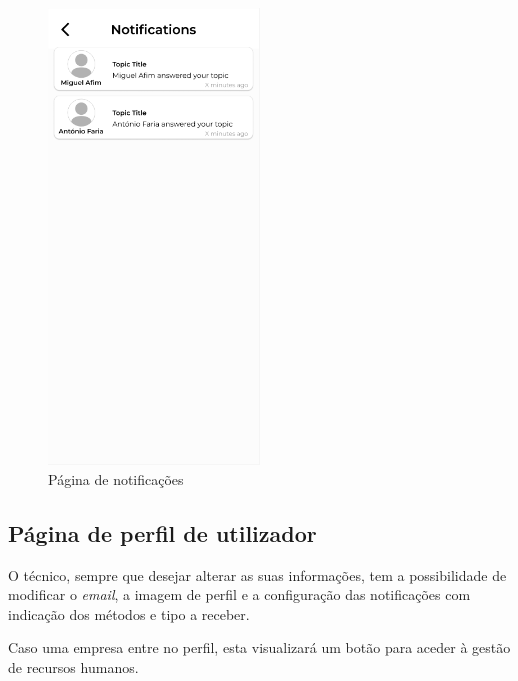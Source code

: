 \begin{figure}[htb]
    \centering
    \includegraphics[width=0.5\textwidth]{images/mockups/notifications.png}
    \caption{Página de notificações}
    \label{fig:29}
\end{figure}

\newpage

\subsection{Página de perfil de utilizador}

O técnico, sempre que desejar alterar as suas informações, tem a possibilidade de modificar o \textit{email}, a imagem de perfil e a configuração das notificações com indicação dos métodos e tipo a receber.

Caso uma empresa entre no perfil, esta visualizará um botão para aceder à gestão de recursos humanos.

